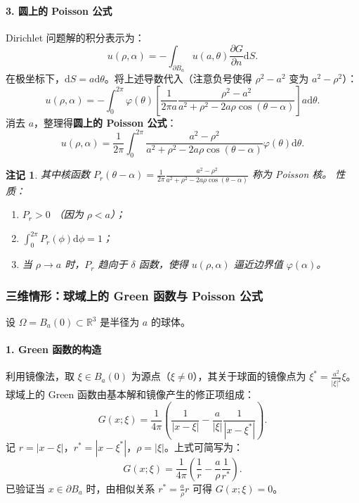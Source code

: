 \documentclass[12pt,a4paper]{ctexart}
\newtheorem*{note}{注记}
\begin{document}
	\paragraph{3. 圆上的 Poisson 公式}
	Dirichlet 问题解的积分表示为：
	\[
	u(\rho, \alpha) = - \int_{\partial B_a} u(a, \theta) \frac{\partial G}{\partial n} \mathrm{d}S.
	\]
	在极坐标下，$\mathrm{d}S = a \mathrm{d}\theta$。将上述导数代入（注意负号使得 $\rho^2 - a^2$ 变为 $a^2 - \rho^2$）：
	\begin{equation}
		u(\rho, \alpha) = - \int_{0}^{2\pi} \varphi(\theta) \left[ \frac{1}{2\pi a} \frac{\rho^2 - a^2}{a^2 + \rho^2 - 2a\rho \cos(\theta - \alpha)} \right] a \mathrm{d}\theta.
	\end{equation}
	消去 $a$，整理得\textbf{圆上的 Poisson 公式}：
	\begin{equation}
		u(\rho, \alpha) = \frac{1}{2\pi} \int_{0}^{2\pi} \frac{a^2 - \rho^2}{a^2 + \rho^2 - 2a\rho \cos(\theta - \alpha)} \varphi(\theta) \mathrm{d}\theta.
	\end{equation}
	
	\begin{note}
		其中核函数 $P_r(\theta-\alpha) = \frac{1}{2\pi} \frac{a^2 - \rho^2}{a^2 + \rho^2 - 2a\rho \cos(\theta - \alpha)}$ 称为 Poisson 核。
		性质：
		\begin{enumerate}
			\item $P_r > 0$ （因为 $\rho < a$）；
			\item $\int_{0}^{2\pi} P_r(\phi) \mathrm{d}\phi = 1$；
			\item 当 $\rho \to a$ 时，$P_r$ 趋向于 $\delta$ 函数，使得 $u(\rho, \alpha)$ 逼近边界值 $\varphi(\alpha)$。
		\end{enumerate}
	\end{note}
	
	\subsubsection{三维情形：球域上的 Green 函数与 Poisson 公式}
	
	设 $\Omega = B_a(0) \subset \mathbb{R}^3$ 是半径为 $a$ 的球体。
	
	\paragraph{1. Green 函数的构造}
	利用镜像法，取 $\xi \in B_a(0)$ 为源点（$\xi \neq 0$），其关于球面的镜像点为 $\xi^* = \frac{a^2}{|\xi|^2} \xi$。
	球域上的 Green 函数由基本解和镜像产生的修正项组成：
	\begin{equation}
		G(x; \xi) = \frac{1}{4\pi} \left( \frac{1}{|x-\xi|} - \frac{a}{|\xi|} \frac{1}{|x-\xi^*|} \right).
	\end{equation}
	记 $r = |x-\xi|$，$r^* = |x-\xi^*|$，$\rho = |\xi|$。上式可简写为：
	\[
	G(x; \xi) = \frac{1}{4\pi} \left( \frac{1}{r} - \frac{a}{\rho} \frac{1}{r^*} \right).
	\]
	已验证当 $x \in \partial B_a$ 时，由相似关系 $r^* = \frac{a}{\rho} r$ 可得 $G(x; \xi) = 0$。
	
\end{document}
